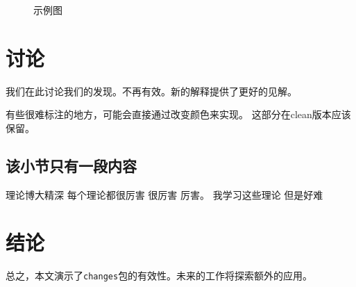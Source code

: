 \documentclass[12pt]{ctexart}
\begin{document}
\begin{figure}[h]
    \centering
    \caption{示例图}
    \label{fig:example}
\end{figure}

\section{讨论}
\label{sec:discussion}

我们在此讨论我们的发现。不再有效。新的解释提供了更好的见解。




    有些很难标注的地方，可能会直接通过改变颜色来实现。
    这部分在clean版本应该保留。


\subsection{该小节只有一段内容}

理论博大精深
每个理论都很厉害 很厉害 厉害。
我学习这些理论
但是好难

\section{结论}
\label{sec:conclusion}

总之，本文演示了\texttt{changes}包的有效性。未来的工作将探索额外的应用。



\end{document}
